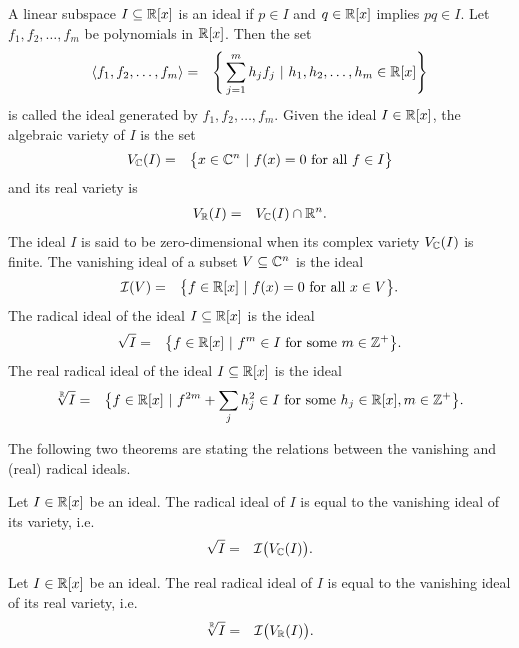 A linear subspace $I \subseteq \mathbb{R}[x]$ is an ideal if $p\in I$ and $q\in\mathbb{R}[x]$ implies $pq \in I$.
Let $f_1, f_2, \ldots, f_m$ be polynomials in $\mathbb{R}[x]$. Then the set
\begin{eqnarray}
  \langle f_1, f_2, \ldots, f_m\rangle &=& \Bigg\{\sum_{j=1}^mh_jf_j\ |\ h_1, h_2, \ldots, h_m\in\mathbb{R}[x]\Bigg\}
\end{eqnarray}
is called the ideal generated by $f_1, f_2, \ldots, f_m$.
Given the ideal $I\in\mathbb{R}[x]$, the algebraic variety of $I$ is the set
\begin{eqnarray}
  V_{\mathbb{C}}(I) &=& \big\{x\in\mathbb{C}^n\ |\ f(x) = 0 \text{ for all } f\in I\big\}
\end{eqnarray}
and its real variety is
\begin{eqnarray}
  V_{\mathbb{R}}(I) &=& V_{\mathbb{C}}(I) \cap \mathbb{R}^n.
\end{eqnarray}
The ideal $I$ is said to be zero-dimensional when its complex variety $V_{\mathbb{C}}(I)$ is finite.
The vanishing ideal of a subset $V\subseteq\mathbb{C}^n$ is the ideal
\begin{eqnarray}
  \mathcal{I}(V) &=& \big\{f\in\mathbb{R}[x]\ |\ f(x) = 0 \text{ for all } x\in V\big\}.
\end{eqnarray}
The radical ideal of the ideal $I\subseteq \mathbb{R}[x]$ is the ideal
\begin{eqnarray}
  \sqrt{I} &=& \big\{f\in\mathbb{R}[x]\ |\ f^m\in I \text{ for some } m\in\mathbb{Z}^+\big\}.
\end{eqnarray}
The real radical ideal of the ideal $I\subseteq \mathbb{R}[x]$ is the ideal
\begin{eqnarray}
  \sqrt[\mathbb{R}]{I} &=& \big\{f\in\mathbb{R}[x]\ |\ f^{2m} + \sum_j h_j^2 \in I \text{ for some } h_j\in\mathbb{R}[x], m\in\mathbb{Z}^+\big\}.
\end{eqnarray}

The following two theorems are stating the relations between the vanishing and (real) radical ideals.

\begin{theorem}
  Let $I\in\mathbb{R}[x]$ be an ideal. The radical ideal of $I$ is equal to the vanishing ideal of its variety, i.e.\
  \begin{eqnarray}
    \sqrt{I} &=& \mathcal{I}\big(V_{\mathbb{C}}(I)\big).
  \end{eqnarray}
\end{theorem}

\begin{theorem}
  Let $I\in\mathbb{R}[x]$ be an ideal. The real radical ideal of $I$ is equal to the vanishing ideal of its real variety, i.e.\
  \begin{eqnarray}
    \sqrt[\mathbb{R}]{I} &=& \mathcal{I}\big(V_{\mathbb{R}}(I)\big).
  \end{eqnarray}
\end{theorem}

